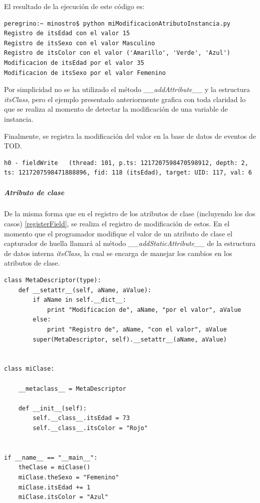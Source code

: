 \documentclass[12pt,legalpaper]{report}
\begin{document}
El resultado de la ejecución de este código es:

\begin{singlespace}
\begin{lstlisting}[style=consola,numbers=none]
peregrino:~ minostro$ python miModificacionAtributoInstancia.py
Registro de itsEdad con el valor 15
Registro de itsSexo con el valor Masculino
Registro de itsColor con el valor ('Amarillo', 'Verde', 'Azul')
Modificacion de itsEdad por el valor 35
Modificacion de itsSexo por el valor Femenino
\end{lstlisting}
\end{singlespace}

Por simplicidad no se ha utilizado el método  \textit{\_\_addAttribute\_\_} y la estructura \textit{itsClass}, pero el ejemplo presentado anteriormente grafica con toda claridad lo que se realiza al momento de detectar la modificación de una variable de instancia.

Finalmente, se registra la modificación del valor en la base de datos de eventos de TOD.

\begin{singlespace}
\begin{lstlisting}[style=consola,numbers=none]
h0 - fieldWrite   (thread: 101, p.ts: 1217207598470598912, depth: 2, ts: 1217207598471888896, fid: 118 (itsEdad), target: UID: 117, val: 6
\end{lstlisting}
\end{singlespace}

					
					\subparagraph{Atributo de clase}

De la misma forma que en el registro de los atributos de clase (incluyendo los dos casos) \ref{registerField}, se realiza el registro de modificación de estos.  En el momento que el programador modifique el valor de un atributo de clase el capturador de huella llamará al método \textit{\_\_addStaticAttribute\_\_} de la estructura de datos interna \textit{itsClass}, la cual se encarga de manejar los cambios en los atributos de clase.

\begin{singlespace}
\begin{lstlisting}[style=Python]
class MetaDescriptor(type):
    def __setattr__(self, aName, aValue):
        if aName in self.__dict__:
            print "Modificacion de", aName, "por el valor", aValue
        else:
            print "Registro de", aName, "con el valor", aValue
        super(MetaDescriptor, self).__setattr__(aName, aValue)
        
        
class miClase:
    
    __metaclass__ = MetaDescriptor
    
    def __init__(self):
        self.__class__.itsEdad = 73
        self.__class__.itsColor = "Rojo"
    

if __name__ == "__main__":
    theClase = miClase()
    miClase.theSexo = "Femenino"
    miClase.itsEdad += 1
    miClase.itsColor = "Azul"
\end{lstlisting}
\end{singlespace}
\end{document}
